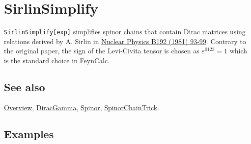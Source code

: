 \documentclass[../FeynCalcManual.tex]{subfiles}
\begin{document}
\hypertarget{sirlinsimplify}{%
\section{SirlinSimplify}\label{sirlinsimplify}}

\texttt{SirlinSimplify[\allowbreak{}exp]} simplifies spinor chains that
contain Dirac matrices using relations derived by A. Sirlin in
\href{https://doi.org/10.1016/0550-3213(81)90195-4}{Nuclear Physics B192
(1981) 93-99}. Contrary to the original paper, the sign of the
Levi-Civita tensor is chosen as \(\varepsilon^{0123}=1\) which is the
standard choice in FeynCalc.

\subsection{See also}

\hyperlink{toc}{Overview}, \hyperlink{diracgamma}{DiracGamma},
\hyperlink{spinor}{Spinor},
\hyperlink{spinorchaintrick}{SpinorChainTrick}.

\subsection{Examples}

\begin{Shaded}
\begin{Highlighting}[]
\OperatorTok{[}\OperatorTok{,}\OperatorTok{]}\OperatorTok{[}\SpecialCharTok{\textbackslash{}}\OperatorTok{[}\OperatorTok{],} \SpecialCharTok{\textbackslash{}}\OperatorTok{[}\OperatorTok{],} \SpecialCharTok{\textbackslash{}}\OperatorTok{[}\OperatorTok{],} \OperatorTok{]}\OperatorTok{[}\OperatorTok{,}\OperatorTok{]}\OperatorTok{[}\OperatorTok{,}\OperatorTok{]}\OperatorTok{[}\SpecialCharTok{\textbackslash{}}\OperatorTok{[}\OperatorTok{],} \SpecialCharTok{\textbackslash{}}\OperatorTok{[}\OperatorTok{],} \SpecialCharTok{\textbackslash{}}\OperatorTok{[}\OperatorTok{],} \OperatorTok{]}\OperatorTok{[}\OperatorTok{,}\OperatorTok{]} 
 
\OperatorTok{[}\SpecialCharTok{\%}\OperatorTok{]}
\end{Highlighting}
\end{Shaded}
\end{document}
